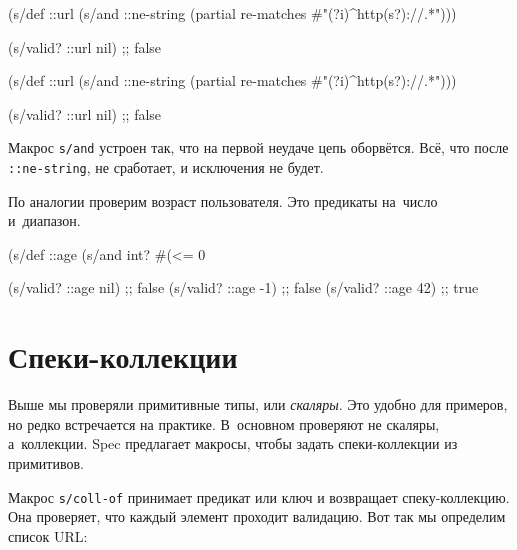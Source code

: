\ifx\devicetype\mobile

\begin{english}
  \begin{clojure}
(s/def ::url
  (s/and ::ne-string
         (partial re-matches
           #"(?i)^http(s?)://.*")))

(s/valid? ::url nil) ;; false
  \end{clojure}
\end{english}

\else

\begin{english}
  \begin{clojure}
(s/def ::url
  (s/and ::ne-string
         (partial re-matches #"(?i)^http(s?)://.*")))

(s/valid? ::url nil) ;; false
  \end{clojure}
\end{english}

\fi


Макрос \verb|s/and| устроен так, что на первой неудаче цепь
оборвётся. Всё, что после \verb|::ne-string|, не сработает, и
исключения не будет.

По аналогии проверим возраст пользователя. Это предикаты на~число и~диапазон.

\begin{english}
  \begin{clojure}
(s/def ::age
  (s/and int? #(<= 0 %

(s/valid? ::age nil) ;; false
(s/valid? ::age -1)  ;; false
(s/valid? ::age 42)  ;; true
  \end{clojure}
\end{english}

\section{Спеки-коллекции}


Выше мы проверяли примитивные типы, или \emph{скаляры}. Это удобно для примеров,
но редко встречается на практике. В~основном проверяют не скаляры,
а~коллекции. Spec предлагает макросы, чтобы задать спеки-коллекции из
примитивов.


Макрос \verb|s/coll-of| принимает предикат или ключ и возвращает
спеку-коллекцию. Она проверяет, что каждый элемент проходит валидацию. Вот так
мы определим список URL:

